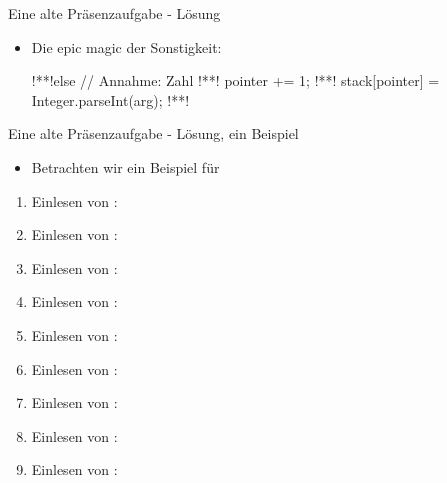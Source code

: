 \begin{frame}[t,fragile]{Eine alte Präsenzaufgabe - Lösung}
\begin{itemize}[<+(1)->]
    \item Die epic magic der Sonstigkeit:
\begin{java}[firstnumber=16]
!**!else { // Annahme: Zahl
!**!    pointer += 1;
!**!    stack[pointer] = Integer.parseInt(arg);
!**!}
\end{java}
\end{itemize}
\end{frame}

\begin{frame}[t,fragile]{Eine alte Präsenzaufgabe - Lösung, ein Beispiel}
\begin{itemize}[<+(1)->]
    \item Betrachten wir ein Beispiel für 
\end{itemize}\vspace*{-\smallskipamount}
\begin{multicols}{3}
\begin{enumerate}[<+(1)->]
    \item Einlesen von :\\ 
    \item Einlesen von :\\ 
    \item Einlesen von :\\ 
    \item Einlesen von :\\ 
    \item Einlesen von :\\ 
    \item Einlesen von :\\ 
    \item Einlesen von :\\ 
    \item Einlesen von :\\ 
    \item Einlesen von :\\ 
\end{enumerate}
\end{multicols}
\end{frame}
\endgroup

